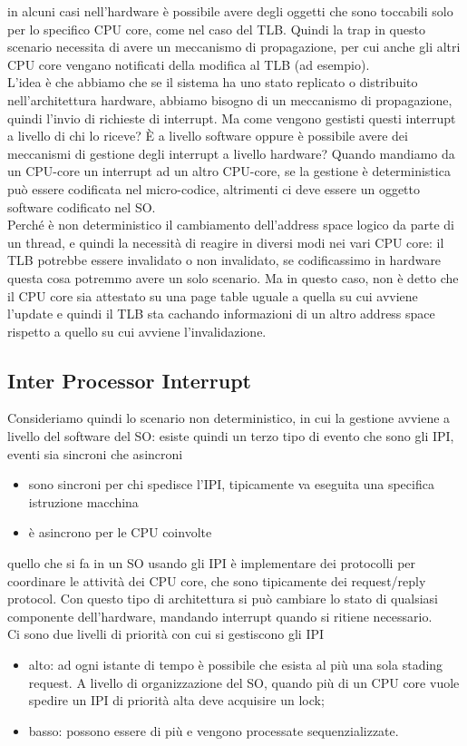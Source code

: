 \documentclass[12pt, oneside]{extbook}
\begin{document}
in alcuni casi nell'hardware è possibile avere degli oggetti che sono toccabili solo per lo specifico CPU core, come nel caso del TLB. Quindi la trap in questo scenario necessita di avere un meccanismo di propagazione, per cui anche gli altri CPU core vengano notificati della modifica al TLB (ad esempio).\\L'idea è che abbiamo che se il sistema ha uno stato replicato o distribuito nell'architettura hardware, abbiamo bisogno di un meccanismo di propagazione, quindi l'invio di richieste di interrupt. Ma come vengono gestisti questi interrupt a livello di chi lo riceve? È a livello software oppure è possibile avere dei meccanismi di gestione degli interrupt a livello hardware? Quando mandiamo da un CPU-core un interrupt ad un altro CPU-core, se la gestione è deterministica può essere codificata nel micro-codice, altrimenti ci deve essere un oggetto software codificato nel SO.\\Perché è non deterministico il cambiamento dell'address space logico da parte di un thread, e quindi la necessità di reagire in diversi modi nei vari CPU core: il TLB potrebbe essere invalidato o non invalidato, se codificassimo in hardware questa cosa potremmo avere un solo scenario. Ma in questo caso, non è detto che il CPU core sia attestato su una page table uguale a quella su cui avviene l'update e quindi il TLB sta cachando informazioni di un altro address space rispetto a quello su cui avviene l'invalidazione.
\subsection{Inter Processor Interrupt}
Consideriamo quindi lo scenario non deterministico, in cui la gestione avviene a livello del software del SO: esiste quindi un terzo tipo di evento che sono gli IPI, eventi sia sincroni che asincroni
\begin{itemize}
\item sono sincroni per chi spedisce l'IPI, tipicamente va eseguita una specifica istruzione macchina
\item è asincrono per le CPU coinvolte
\end{itemize}
quello che si fa in un SO usando gli IPI è implementare dei protocolli per coordinare le attività dei CPU core, che sono tipicamente dei request/reply protocol. Con questo tipo di architettura si può cambiare lo stato di qualsiasi componente dell'hardware, mandando interrupt quando si ritiene necessario.\\Ci sono due livelli di priorità con cui si gestiscono gli IPI
\begin{itemize}
\item alto: ad ogni istante di tempo è possibile che esista al più una sola stading request. A livello di organizzazione del SO, quando più di un CPU core vuole spedire un IPI di priorità alta deve acquisire un lock;
\item basso: possono essere di più e vengono processate sequenzializzate.
\end{itemize} 
\end{document}
